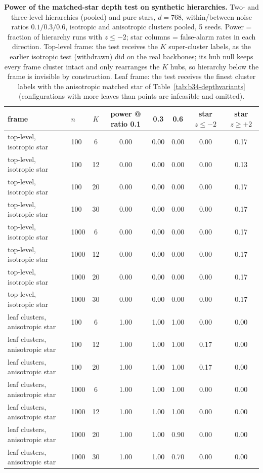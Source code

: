 \begin{table}[H]
\centering
\small
\setlength{\tabcolsep}{4pt}
\begin{tabular}{llcccccc}
\toprule
frame & $n$ & $K$ & power @ ratio 0.1 & 0.3 & 0.6 & star $z\le-2$ & star $z\ge+2$ \\
\midrule
top-level, isotropic star & 100 & 6 & 0.00 & 0.00 & 0.00 & 0.00 & 0.17 \\
top-level, isotropic star & 100 & 12 & 0.00 & 0.00 & 0.00 & 0.00 & 0.13 \\
top-level, isotropic star & 100 & 20 & 0.00 & 0.00 & 0.00 & 0.00 & 0.17 \\
top-level, isotropic star & 100 & 30 & 0.00 & 0.00 & 0.00 & 0.00 & 0.17 \\
top-level, isotropic star & 1000 & 6 & 0.00 & 0.00 & 0.00 & 0.00 & 0.17 \\
top-level, isotropic star & 1000 & 12 & 0.00 & 0.00 & 0.00 & 0.00 & 0.17 \\
top-level, isotropic star & 1000 & 20 & 0.00 & 0.00 & 0.00 & 0.00 & 0.17 \\
top-level, isotropic star & 1000 & 30 & 0.00 & 0.00 & 0.00 & 0.00 & 0.17 \\
\midrule
leaf clusters, anisotropic star & 100 & 6 & 1.00 & 1.00 & 1.00 & 0.00 & 0.00 \\
leaf clusters, anisotropic star & 100 & 12 & 1.00 & 1.00 & 1.00 & 0.17 & 0.00 \\
leaf clusters, anisotropic star & 100 & 20 & 1.00 & 1.00 & 1.00 & 0.17 & 0.00 \\
leaf clusters, anisotropic star & 1000 & 6 & 1.00 & 1.00 & 1.00 & 0.00 & 0.00 \\
leaf clusters, anisotropic star & 1000 & 12 & 1.00 & 1.00 & 1.00 & 0.00 & 0.00 \\
leaf clusters, anisotropic star & 1000 & 20 & 1.00 & 1.00 & 0.90 & 0.00 & 0.00 \\
leaf clusters, anisotropic star & 1000 & 30 & 1.00 & 1.00 & 0.70 & 0.00 & 0.00 \\
\bottomrule
\end{tabular}
\caption{\textbf{Power of the matched-star depth test on synthetic hierarchies.} Two- and three-level hierarchies (pooled) and pure stars, $d{=}768$, within/between noise ratios $0.1/0.3/0.6$, isotropic and anisotropic clusters pooled, 5 seeds. Power = fraction of hierarchy runs with $z\le-2$; star columns = false-alarm rates in each direction. Top-level frame: the test receives the $K$ super-cluster labels, as the earlier isotropic test (withdrawn) did on the real backbones; its hub null keeps every frame cluster intact and only rearranges the $K$ hubs, so hierarchy below the frame is invisible by construction. Leaf frame: the test receives the finest cluster labels with the anisotropic matched star of Table~\ref{tab:b34-depthvariants} (configurations with more leaves than points are infeasible and omitted). %
}
\label{tab:b35-power}
\end{table}
